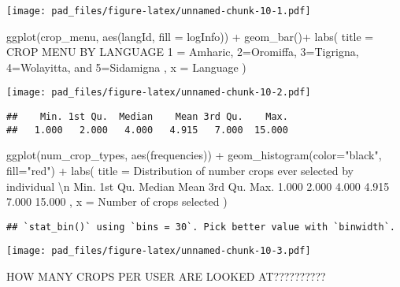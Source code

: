 \documentclass[
]{article}
\newenvironment{Shaded}{\begin{snugshade}}{\end{snugshade}}
\newcommand{\AttributeTok}[1]{\textcolor[rgb]{0.77,0.63,0.00}{#1}}
\newcommand{\FunctionTok}[1]{\textcolor[rgb]{0.00,0.00,0.00}{#1}}
\newcommand{\NormalTok}[1]{#1}
\newcommand{\OtherTok}[1]{\textcolor[rgb]{0.56,0.35,0.01}{#1}}
\newcommand{\SpecialCharTok}[1]{\textcolor[rgb]{0.00,0.00,0.00}{#1}}
\newcommand{\StringTok}[1]{\textcolor[rgb]{0.31,0.60,0.02}{#1}}
\begin{document}
\texttt{[image: pad\_files/figure-latex/unnamed-chunk-10-1.pdf]}

\begin{Shaded}
\begin{Highlighting}[]
\FunctionTok{ggplot}\NormalTok{(crop\_menu, }\FunctionTok{aes}\NormalTok{(langId, }\AttributeTok{fill =}\NormalTok{ logInfo)) }\SpecialCharTok{+}
  \FunctionTok{geom\_bar}\NormalTok{()}\SpecialCharTok{+}
  \FunctionTok{labs}\NormalTok{(}
    \AttributeTok{title =} \StringTok{\textquotesingle{}CROP MENU BY LANGUAGE}
\StringTok{    1 = Amharic, 2=Oromiffa, 3=Tigrigna, 4=Wolayitta, and 5=Sidamigna}
\StringTok{    \textquotesingle{}}\NormalTok{,}
    \AttributeTok{x =} \StringTok{\textquotesingle{}Language\textquotesingle{}}
\NormalTok{  )}
\end{Highlighting}
\end{Shaded}

\texttt{[image: pad\_files/figure-latex/unnamed-chunk-10-2.pdf]}

\begin{Shaded}
\end{Shaded}

\begin{verbatim}
##    Min. 1st Qu.  Median    Mean 3rd Qu.    Max. 
##   1.000   2.000   4.000   4.915   7.000  15.000
\end{verbatim}

\begin{Shaded}
\begin{Highlighting}[]
\FunctionTok{ggplot}\NormalTok{(num\_crop\_types, }\FunctionTok{aes}\NormalTok{(frequencies)) }\SpecialCharTok{+}
  \FunctionTok{geom\_histogram}\NormalTok{(}\AttributeTok{color=}\StringTok{"black"}\NormalTok{, }\AttributeTok{fill=}\StringTok{"red"}\NormalTok{) }\SpecialCharTok{+}
  \FunctionTok{labs}\NormalTok{(}
    \AttributeTok{title =} \StringTok{\textquotesingle{}Distribution of number crops ever selected by individual }\SpecialCharTok{\textbackslash{}n}
\StringTok{      Min.  1st Qu.  Median    Mean   3rd Qu.    Max. }
\StringTok{  1.000     2.000     4.000      4.915     7.000     15.000 \textquotesingle{}}\NormalTok{,}
    \AttributeTok{x =} \StringTok{\textquotesingle{}Number of crops selected \textquotesingle{}}
\NormalTok{  )}
\end{Highlighting}
\end{Shaded}

\begin{verbatim}
## `stat_bin()` using `bins = 30`. Pick better value with `binwidth`.
\end{verbatim}

\texttt{[image: pad\_files/figure-latex/unnamed-chunk-10-3.pdf]}

HOW MANY CROPS PER USER ARE LOOKED AT??????????
\end{document}
